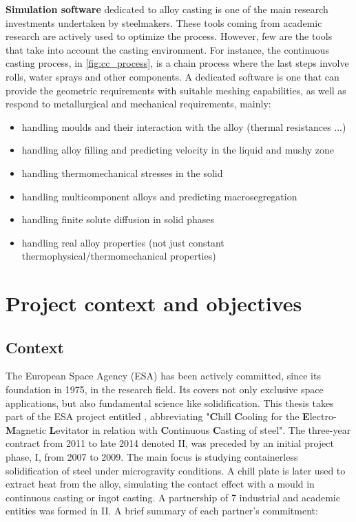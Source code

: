 \textbf{Simulation software} dedicated to alloy casting is one of the main research investments undertaken by steelmakers. These tools coming from academic research
are actively used to optimize the process. However, few are the tools that take into account the casting environment. For instance, the continuous casting process, in
\cref{fig:cc_process}, is a chain process where the last steps involve rolls, water sprays and other components. A dedicated software is one that can provide the
geometric requirements with suitable meshing capabilities, as well as respond to metallurgical and mechanical requirements, mainly:
\begin{itemize}
\itemsep0em
\item handling moulds and their interaction with the alloy (thermal resistances ...)
\item handling alloy filling and predicting velocity in the liquid and mushy zone
\item handling thermomechanical stresses in the solid
\item handling multicomponent alloys and predicting macrosegregation
\item handling finite solute diffusion in solid phases
\item handling real alloy properties (not just constant thermophysical/thermomechanical properties)
\end{itemize}
%
%
\section{Project context and objectives}
%
\subsection{Context}
The European Space Agency (ESA) has been actively committed, since its foundation in 1975, in the research field.
Its covers not only exclusive space applications, but also fundamental science like solidification. 
This thesis takes part of the ESA project entitled \ccemlcc, abbreviating
"\textbf{C}hill \textbf{C}ooling for the \textbf{E}lectro-\textbf{M}agnetic \textbf{L}evitator in relation with 
\textbf{C}ontinuous \textbf{C}asting of steel".
The three-year contract from 2011 to late 2014 denoted \ccemlcc II, was preceded by an initial project phase, \ccemlcc I,
from 2007 to 2009. The main focus is studying containerless solidification of steel under microgravity conditions. 
A chill plate is later used to extract heat from the alloy, simulating the contact effect with a mould in continuous casting
or ingot casting.
A partnership of 7 industrial and academic entities was formed in \ccemlcc II. A brief summary of each partner's commitment:\\

